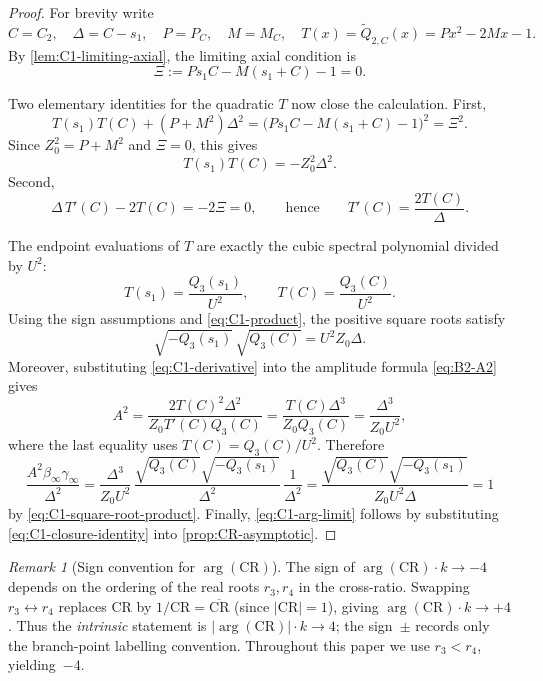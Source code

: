 \documentclass[11pt,a4paper]{article}
\theoremstyle{plain}
\theoremstyle{definition}
\theoremstyle{remark}
\newtheorem{remark}[theorem]{Remark}
\newcommand{\abs}[1]{\lvert #1 \rvert}
\begin{document}
\begin{proof}
For brevity write
\[
  C=C_2,\quad \Delta=C-s_1,\quad
  P=P_C,\quad M=M_C,\quad
  T(x)=\tilde Q_{2,C}(x)=Px^2-2Mx-1 .
\]
By \cref{lem:C1-limiting-axial}, the limiting axial condition is
\[
  \Xi:=Ps_1C-M(s_1+C)-1=0 .
\]

Two elementary identities for the quadratic $T$ now close the
calculation.  First,
\begin{equation}\label{eq:C1-quadratic-product}
  T(s_1)T(C)+(P+M^2)\Delta^2
  =
  \bigl(Ps_1C-M(s_1+C)-1\bigr)^2
  =
  \Xi^2 .
\end{equation}
Since $Z_0^2=P+M^2$ and $\Xi=0$, this gives
\begin{equation}\label{eq:C1-product}
  T(s_1)T(C)=-Z_0^2\Delta^2 .
\end{equation}
Second,
\begin{equation}\label{eq:C1-derivative}
  \Delta\,T'(C)-2T(C)=-2\Xi=0,
  \qquad\text{hence}\qquad
  T'(C)=\frac{2T(C)}{\Delta}.
\end{equation}

The endpoint evaluations of $T$ are exactly the cubic spectral
polynomial divided by $U^2$:
\begin{equation}\label{eq:C1-T-evals}
  T(s_1)=\frac{Q_3(s_1)}{U^2},
  \qquad
  T(C)=\frac{Q_3(C)}{U^2}.
\end{equation}
Using the sign assumptions and \eqref{eq:C1-product}, the positive
square roots satisfy
\begin{equation}\label{eq:C1-square-root-product}
  \sqrt{-Q_3(s_1)}\,\sqrt{Q_3(C)}
  =
  U^2 Z_0\Delta .
\end{equation}
Moreover, substituting \eqref{eq:C1-derivative} into the amplitude
formula \eqref{eq:B2-A2} gives
\[
  A^2
  =
  \frac{2T(C)^2\Delta^2}{Z_0T'(C)Q_3(C)}
  =
  \frac{T(C)\Delta^3}{Z_0Q_3(C)}
  =
  \frac{\Delta^3}{Z_0U^2},
\]
where the last equality uses $T(C)=Q_3(C)/U^2$.  Therefore
\[
  \frac{A^2\beta_\infty\gamma_\infty}{\Delta^2}
  =
  \frac{\Delta^3}{Z_0U^2}\,
  \frac{\sqrt{Q_3(C)}\sqrt{-Q_3(s_1)}}{\Delta^2}\,
  \frac{1}{\Delta^2}
  =
  \frac{\sqrt{Q_3(C)}\sqrt{-Q_3(s_1)}}{Z_0U^2\Delta}
  =
  1
\]
by \eqref{eq:C1-square-root-product}.  Finally,
\eqref{eq:C1-arg-limit} follows by substituting
\eqref{eq:C1-closure-identity} into
\cref{prop:CR-asymptotic}.
\end{proof}

\begin{remark}[Sign convention for $\arg(\mathrm{CR})$]
\label{rem:CR-sign}
The sign of $\arg(\mathrm{CR}) \cdot k \to -4$ depends on the
ordering of the real roots $r_3, r_4$ in the cross-ratio.
Swapping $r_3 \leftrightarrow r_4$ replaces $\mathrm{CR}$ by
$1/\mathrm{CR} = \overline{\mathrm{CR}}$ (since $\abs{\mathrm{CR}} = 1$),
giving $\arg(\mathrm{CR}) \cdot k \to +4$.
Thus the \emph{intrinsic} statement is
$\lvert\arg(\mathrm{CR})\rvert \cdot k \to 4$;
the sign~$\pm$ records only the branch-point labelling convention.
Throughout this paper we use $r_3 < r_4$, yielding~$-4$.
\end{remark}
\end{document}
